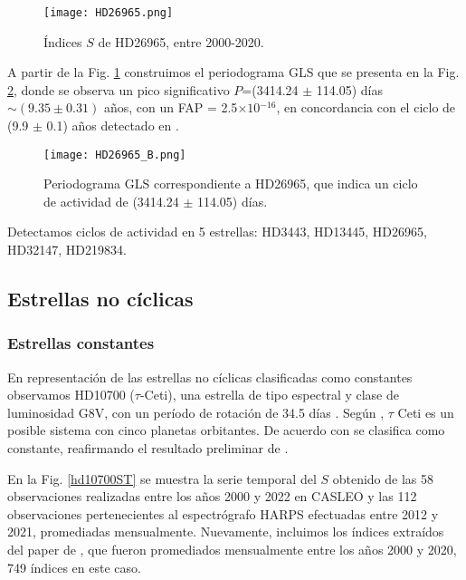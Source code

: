 \documentclass[baaa]{baaa}
\begin{document}
\begin{figure}[hbt!]
\centering
\texttt{[image: HD26965.png]}
\caption{Índices $S$ de HD26965, entre 2000-2020. 
}
\label{hd26965ST}
\end{figure}


A partir de la Fig. \ref{hd26965ST} construimos el periodograma GLS que se presenta en la Fig. \ref{hd26965P}, donde se observa un pico significativo $P$=(3414.24 $\pm$ 114.05) días $\sim (9.35 \pm 0.31)$ años, con un FAP = 2.5$\times1$0$^{-16}$, en concordancia con el ciclo de (9.9 $\pm$ 0.1) años detectado en \cite{Baum22}.

\begin{figure}[hbt!]
\centering
\texttt{[image: HD26965\_B.png]}
\caption{Periodograma GLS correspondiente a HD26965, que indica un ciclo de actividad de (3414.24 $\pm$ 114.05) días.}
\label{hd26965P}
\end{figure}

Detectamos ciclos de actividad en 5 estrellas: HD3443, HD13445, HD26965, HD32147, HD219834.

\subsection{Estrellas no cíclicas}

\subsubsection{Estrellas constantes}

En representación de las estrellas no cíclicas clasificadas como constantes observamos HD10700 ($\tau$-Ceti), una estrella de tipo espectral y clase de luminosidad G8V, con un período de rotación de 34.5 días \citep{Cincunegui07}. Según \cite{Tuomi13}, $\tau$ Ceti es un posible sistema con cinco planetas orbitantes. De acuerdo con \cite{Baum22} se clasifica como constante, reafirmando el resultado preliminar de \cite{Baliunas95}.

En la Fig. \ref{hd10700ST} se muestra la serie temporal del $S$ obtenido de las 58 observaciones realizadas entre los años 2000 y 2022 en CASLEO y las 112 observaciones pertenecientes al espectrógrafo HARPS efectuadas entre 2012 y 2021, promediadas mensualmente. Nuevamente, incluimos los índices extraídos del paper de \cite{Baum22}, que fueron promediados mensualmente entre los años 2000 y 2020, 749 índices en este caso.
\end{document}

